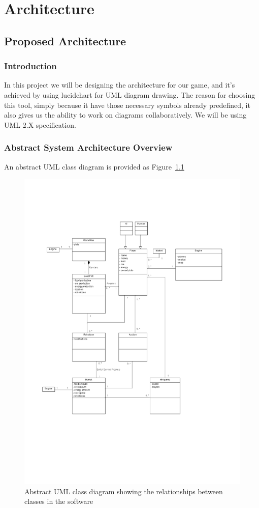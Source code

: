 \chapter{Architecture}


\section{Proposed Architecture}
\subsection{Introduction}
In this project we will be designing the architecture for our game, and it’s achieved by using lucidchart for UML diagram drawing.
The reason for choosing this tool, simply because it have those necessary symbols already predefined, it also gives us the ability to work on diagrams collaboratively. We will be using UML 2.X specification.

\subsection{Abstract System Architecture Overview}
An abstract UML class diagram is provided as Figure~\ref{fig:classdiagram}
\begin{figure}[h]
	\begin{centering}
		\includegraphics{AbstractDiagram.pdf}
		\caption{Abstract UML class diagram showing the relationships between classes in the software}
		\label{fig:classdiagram}
	\end{centering}
\end{figure}

